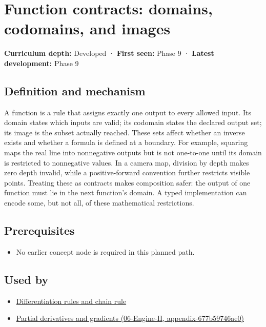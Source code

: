 \hypertarget{appendix-a59658325cd6}{}
\section{Function contracts: domains, codomains, and images}\label{appendix-a59658325cd6-function-contracts-domains-codomains-and-images}

\textbf{Curriculum depth:} Developed · \textbf{First seen:} Phase 9 · \textbf{Latest development:} Phase 9

\subsection{Definition and mechanism}\label{appendix-a59658325cd6-definition-and-mechanism}

A function is a rule that assigns exactly one output to every allowed input. Its domain states which inputs are valid; its codomain states the declared output set; its image is the subset actually reached. These sets affect whether an inverse exists and whether a formula is defined at a boundary. For example, squaring maps the real line into nonnegative outputs but is not one-to-one until its domain is restricted to nonnegative values. In a camera map, division by depth makes zero depth invalid, while a positive-forward convention further restricts visible points. Treating these as contracts makes composition safer: the output of one function must lie in the next function's domain. A typed implementation can encode some, but not all, of these mathematical restrictions.

\subsection{Prerequisites}\label{appendix-a59658325cd6-prerequisites}

\begin{itemize}
\tightlist
\item
  No earlier concept node is required in this planned path.
\end{itemize}

\subsection{Used by}\label{appendix-a59658325cd6-used-by}

\begin{itemize}
\tightlist
\item
  \hyperref[appendix-d9f70bdfbc92]{Differentiation rules and chain rule}
\item
  \href{../06-Engine-II/main.pdf\#nameddest=appendix-677b59746ae0}{Partial derivatives and gradients (06-Engine-II, appendix-677b59746ae0)}
\end{itemize}

